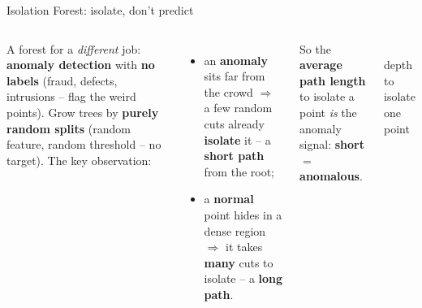 \documentclass[aspectratio=169]{beamer}
\begin{document}
\begin{frame}{Isolation Forest: isolate, don't predict}
  \begin{columns}[T]
    A forest for a \emph{different} job: \textbf{anomaly detection} with \textbf{no labels}
    (fraud, defects, intrusions -- flag the weird points).
    \vskip 4pt
    Grow trees by \textbf{purely random splits} (random feature, random threshold -- no target).
    The key observation:
    \begin{itemize}\small
      \item an \textbf{anomaly} sits far from the crowd $\Rightarrow$ a few random cuts already
        \textbf{isolate} it -- a \textbf{short path} from the root;
      \item a \textbf{normal} point hides in a dense region $\Rightarrow$ it takes \textbf{many}
        cuts to isolate -- a \textbf{long path}.
    \end{itemize}
    So the \textbf{average path length} to isolate a point \emph{is} the anomaly signal:
    \textbf{short $=$ anomalous}.
    \begin{center}
      \\[2pt]
      \scriptsize depth to isolate one point
    \end{center}
  \end{columns}
\end{frame}
\end{document}
